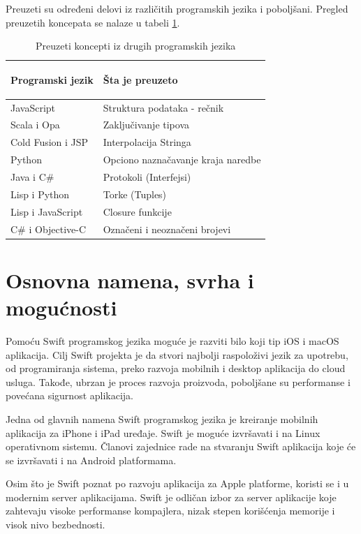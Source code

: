 \documentclass[a4paper]{article}
\begin{document}
Preuzeti su određeni delovi iz različitih programskih jezika i poboljšani. Pregled preuzetih koncepata se nalaze u tabeli \ref{tab:tabela2}.

\begin{table}[h!]
\begin{center}
\caption{Preuzeti koncepti iz drugih programskih jezika}
\begin{tabular}{|l|l|} \hline
\label{tab:tabela2}

Programski jezik & Šta je preuzeto \\ \hline
JavaScript & Struktura podataka - rečnik  \\ \hline
Scala i Opa & Zaključivanje tipova \\ \hline
Cold Fusion i JSP & Interpolacija Stringa \\ \hline
Python & Opciono naznačavanje kraja naredbe \\ \hline
Java i C\# & Protokoli (Interfejsi) \\ \hline
Lisp i Python & Torke (Tuples) \\ \hline
Lisp i JavaScript &  Closure funkcije \\ \hline
C\# i Objective-C & Označeni i neoznačeni brojevi \\ \hline
\end{tabular}
\end{center}
\end{table}

\section{Osnovna namena, svrha i mogućnosti}	
\label{sec:treciDeo}
Pomoću Swift programskog jezika moguće je razviti bilo koji tip iOS i macOS aplikacija. Cilj Swift projekta je da stvori najbolji raspoloživi jezik za upotrebu, od programiranja sistema, preko razvoja mobilnih i desktop aplikacija do cloud usluga. Takođe, ubrzan je proces razvoja proizvoda, poboljšane su performanse i povećana sigurnost aplikacija.

Jedna od glavnih namena Swift programskog jezika je kreiranje mobilnih aplikacija za iPhone i iPad uređaje. Swift je moguće izvršavati i na Linux operativnom sistemu. Članovi zajednice rade na stvaranju Swift aplikacija koje će se izvršavati i na Android platformama.

Osim što je Swift poznat po razvoju aplikacija za Apple platforme, koristi se i u modernim server aplikacijama. Swift je odličan izbor za server aplikacije koje zahtevaju visoke performanse kompajlera, nizak stepen korišćenja memorije i visok nivo bezbednosti.
\end{document}
